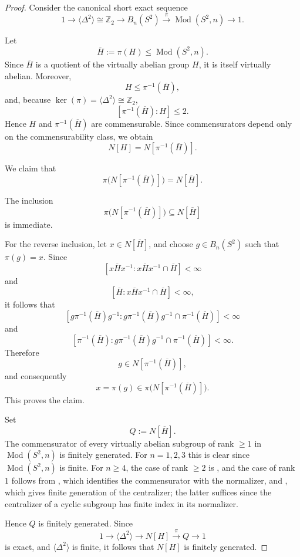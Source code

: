 \documentclass[a4paper,12pt,leqno]{amsart}
\theoremstyle{definition}
\DeclareMathOperator{\mcg}{Mod}
\begin{document}
\begin{proof}
Consider the canonical short exact sequence
\[
1\longrightarrow \langle \Delta^2\rangle\cong \mathbb Z_2
\longrightarrow B_n(S^2)
\overset{\pi}{\longrightarrow}
\operatorname{Mod}(S^2,n)
\longrightarrow 1.
\]

Let
\[
\overline H:=\pi(H)\leq \operatorname{Mod}(S^2,n).
\]
Since \(\overline H\) is a quotient of the virtually abelian group \(H\), it is itself virtually abelian. Moreover,
\[
H\leq \pi^{-1}(\overline H),
\]
and, because \(\ker(\pi)=\langle \Delta^2\rangle\cong \mathbb Z_2\),
\[
[\pi^{-1}(\overline H):H]\leq 2.
\]
Hence \(H\) and \(\pi^{-1}(\overline H)\) are commensurable. Since commensurators depend only on the commensurability class, we obtain
\[
N[H]=N[\pi^{-1}(\overline H)].
\]

We claim that
\[
\pi\bigl(N[\pi^{-1}(\overline H)]\bigr)
=
N[\overline H].
\]

The inclusion
\[
\pi\bigl(N[\pi^{-1}(\overline H)]\bigr)
\subseteq
N[\overline H]
\]
is immediate.

For the reverse inclusion, let \(x\in N[\overline H]\), and choose
\(g\in B_n(S^2)\) such that \(\pi(g)=x\). Since
\[
[x\overline Hx^{-1}:x\overline Hx^{-1}\cap \overline H]<\infty
\]
and
\[
[\overline H:x\overline Hx^{-1}\cap \overline H]<\infty,
\]
it follows that
\[
[g\pi^{-1}(\overline H)g^{-1}:
g\pi^{-1}(\overline H)g^{-1}\cap \pi^{-1}(\overline H)]<\infty
\]
and
\[
[\pi^{-1}(\overline H):
g\pi^{-1}(\overline H)g^{-1}\cap \pi^{-1}(\overline H)]<\infty.
\]
Therefore
\[
g\in N[\pi^{-1}(\overline H)],
\]
and consequently
\[
x=\pi(g)\in
\pi\bigl(N[\pi^{-1}(\overline H)]\bigr).
\]
This proves the claim.

Set
\[
Q:=N[\overline H].
\]
The commensurator of every virtually abelian subgroup of rank $\geq 1$ in $\mcg(S^2,n)$ is finitely generated. For $n=1,2,3$ this is clear since $\mcg(S^2,n)$ is finite. For $n\geq 4$, the case of rank $\geq 2$ is \cite[Corollary~4.6]{Rita:Porfirio:Luis}, and the case of rank $1$ follows from \cite[Proposition~4.2]{Rita:Porfirio:Luis}, which identifies the commensurator with the normalizer, and \cite[Proposition~4.12]{MR3767218}, which gives finite generation of the centralizer; the latter suffices since the centralizer of a cyclic subgroup has finite index in its normalizer.

Hence \(Q\) is finitely generated. Since
\[
1\longrightarrow \langle \Delta^2\rangle
\longrightarrow N[H]
\overset{\pi}{\longrightarrow}
Q
\longrightarrow 1
\]
is exact, and \(\langle \Delta^2\rangle\) is finite, it follows that \(N[H]\) is finitely generated.
\end{proof}
\end{document}
